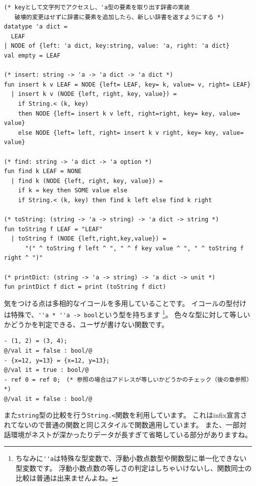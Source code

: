 \documentclass[11pt,a4paper]{article}
\begin{document}
\begin{lstlisting}[caption=２分探索木による辞書の実装,label=code:dict]
(* keyとして文字列でアクセスし、'a型の要素を取り出す辞書の実装
   破壊的変更はせずに辞書に要素を追加したら、新しい辞書を返すようにする *)
datatype 'a dict =
  LEAF
| NODE of {left: 'a dict, key:string, value: 'a, right: 'a dict}
val empty = LEAF

(* insert: string -> 'a -> 'a dict -> 'a dict *)
fun insert k v LEAF = NODE {left= LEAF, key= k, value= v, right= LEAF}
  | insert k v (NODE {left, right, key, value}) =
    if String.< (k, key)
    then NODE {left= insert k v left, right=right, key= key, value= value}
    else NODE {left= left, right= insert k v right, key= key, value= value}

(* find: string -> 'a dict -> 'a option *)
fun find k LEAF = NONE
  | find k (NODE {left, right, key, value}) =
    if k = key then SOME value else
    if String.< (k, key) then find k left else find k right

(* toString: (string -> 'a -> string) -> 'a dict -> string *)
fun toString f LEAF = "LEAF"
  | toString f (NODE {left,right,key,value}) =
      "(" ^ toString f left ^ ", " ^ f key value ^ ", " ^ toString f right ^ ")"

(* printDict: (string -> 'a -> string) -> 'a dict -> unit *)
fun printDict f dict = print (toString f dict)
\end{lstlisting}


気をつける点は多相的なイコールを多用していることです。
イコールの型付けは特殊で、\lstinline{''a * ''a -> bool}という型を持ちます
\footnote{ちなみに\lstinline{''a}は特殊な型変数で、浮動小数点数型や関数型に単一化できない型変数です。
浮動小数点数の等しさの判定はしちゃいけないし、関数同士の比較は普通は出来ませんよね。}。
色々な型に対して等しいかどうかを判定できる、ユーザが書けない関数です。

\begin{lstlisting}[caption=イコールを乱用する,label=code:equal]
- (1, 2) = (3, 4);
@/val it = false : bool/@
- {x=12, y=13} = {x=12, y=13};
@/val it = true : bool/@
- ref 0 = ref 0;　(* 参照の場合はアドレスが等しいかどうかのチェック（後の章参照）*)
@/val it = false : bool/@
\end{lstlisting}

また\lstinline{string}型の比較を行う\lstinline{String.<}関数を利用しています。
これはinfix宣言されてないので普通の関数と同じスタイルで関数適用しています。
また、一部対話環境がネストが深かったりデータが長すぎて省略している部分がありますね。
\end{document}
